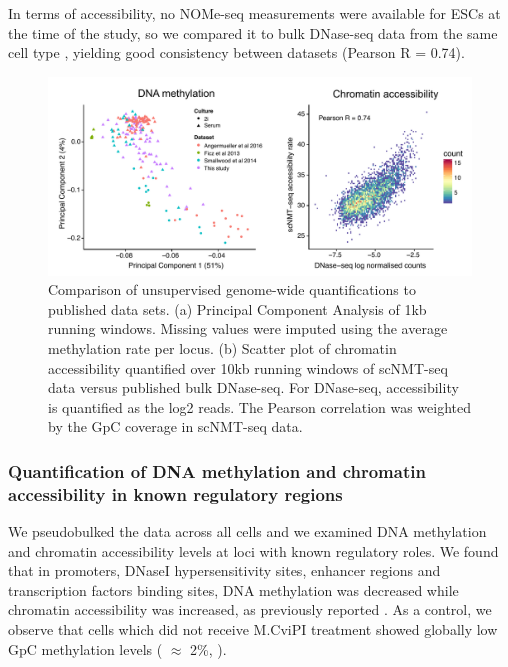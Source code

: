 In terms of accessibility, no NOMe-seq measurements were available for ESCs at the time of the study, so we compared it to bulk DNase-seq data from the same cell type \cite{XX}, yielding good consistency between datasets (Pearson R = 0.74).
\begin{figure}[H]
	\centering
	\includegraphics[width=1.0\linewidth]{scNMT_comparison}
	\caption[]{Comparison of unsupervised genome-wide quantifications to published data sets. (a) Principal Component Analysis of 1kb running windows. Missing values were imputed using the average methylation rate per locus. (b) Scatter plot of chromatin accessibility quantified over 10kb running windows of scNMT-seq data versus published bulk DNase-seq. For DNase-seq, accessibility is quantified as the log2 reads. The Pearson correlation was weighted by the GpC coverage in scNMT-seq data. }
	\label{fig:scnmt_comparison}
\end{figure}


\subsubsection{Quantification of DNA methylation and chromatin accessibility in known regulatory regions}

We pseudobulked the data across all cells and we examined DNA methylation and chromatin accessibility levels at loci with known regulatory roles. We found that in promoters, DNaseI hypersensitivity sites, enhancer regions and transcription factors binding sites, DNA methylation was decreased while chromatin accessibility was increased, as previously reported \cite{Pott2016}. As a control, we observe that cells which did not receive M.CviPI treatment showed globally low GpC methylation levels ( $\approx$ 2\%, ).


